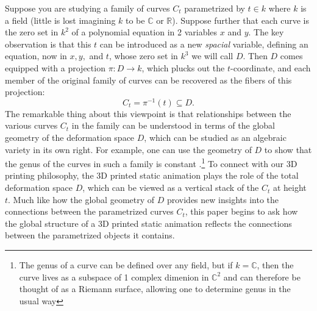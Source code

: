 \documentclass[12 pt]{article}
\newcommand{\bR}{\mathbb{R}}
\newcommand{\bC}{\mathbb{C}}
\begin{document}
Suppose you are studying a family of curves $C_t$ parametrized by $t\in k$ where $k$ is a field (little is lost imagining $k$ to be $\bC$ or $\bR$).  Suppose further that each curve is the zero set in $k^2$ of a polynomial equation in 2 variables $x$ and $y$.  The key observation is that this $t$ can be introduced as a new \textit{spacial} variable, defining an equation, now in $x,y,$ and $t$, whose zero set in $k^3$ we will call $D$.  Then $D$ comes equipped with a projection $\pi:D\to k$, which plucks out the $t$-coordinate, and each member of the original family of curves can be recovered as the fibers of this projection:
\[C_t = \pi^{-1}(t)\subseteq D.\]
The remarkable thing about this viewpoint is that relationships between the various curves $C_t$ in the family can be understood in terms of the global geometry of the deformation space $D$, which can be studied as an algebraic variety in its own right. For example, one can use the geometry of $D$ to show that the genus of the curves in such a family is constant \cite[Corollary III.9.13]{Hartshorne}.\footnote{The genus of a curve can be defined over any field,  but if $k=\bC$, then the curve lives as a subspace of 1 complex dimenion in $\bC^2$ and can therefore be thought of as a Riemann surface, allowing one to determine genus in the usual way} To connect with our 3D printing philosophy, the 3D printed static animation plays the role of the total deformation space $D$, which can be viewed as a vertical stack of the $C_t$ at height $t$.  Much like how the global geometry of $D$ provides new insights into the connections between the parametrized curves $C_t$, this paper begins to ask how the global structure of a 3D printed static animation reflects the connections between the parametrized objects it contains.\\
\end{document}

